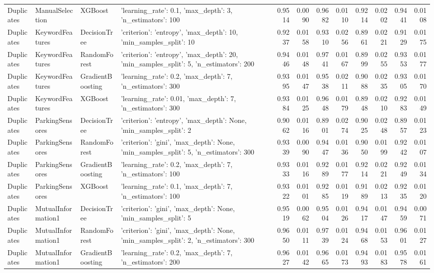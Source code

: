 \begin{tabular}{llllrrrrrrrr}
Duplicates & ManualSelection & XGBoost & {'learning_rate': 0.1, 'max_depth': 3, 'n_estimators': 100} & 0.9514 & 0.0090 & 0.9682 & 0.0110 & 0.9214 & 0.0202 & 0.9441 & 0.0108 \\
Duplicates & KeywordFeatures & DecisionTree & {'criterion': 'entropy', 'max_depth': 10, 'min_samples_split': 10} & 0.9237 & 0.0158 & 0.9310 & 0.0256 & 0.8961 & 0.0221 & 0.9129 & 0.0175 \\
Duplicates & KeywordFeatures & RandomForest & {'criterion': 'entropy', 'max_depth': 20, 'min_samples_split': 5, 'n_estimators': 200} & 0.9446 & 0.0148 & 0.9741 & 0.0167 & 0.8999 & 0.0255 & 0.9353 & 0.0177 \\
Duplicates & KeywordFeatures & GradientBoosting & {'learning_rate': 0.2, 'max_depth': 7, 'n_estimators': 300} & 0.9395 & 0.0147 & 0.9538 & 0.0211 & 0.9088 & 0.0235 & 0.9305 & 0.0170 \\
Duplicates & KeywordFeatures & XGBoost & {'learning_rate': 0.01, 'max_depth': 7, 'n_estimators': 300} & 0.9384 & 0.0125 & 0.9648 & 0.0179 & 0.8948 & 0.0210 & 0.9283 & 0.0149 \\
Duplicates & ParkingSensores & DecisionTree & {'criterion': 'entropy', 'max_depth': None, 'min_samples_split': 2} & 0.9062 & 0.0116 & 0.8901 & 0.0274 & 0.9025 & 0.0248 & 0.8957 & 0.0123 \\
Duplicates & ParkingSensores & RandomForest & {'criterion': 'gini', 'max_depth': None, 'min_samples_split': 5, 'n_estimators': 300} & 0.9339 & 0.0090 & 0.9447 & 0.0136 & 0.9050 & 0.0199 & 0.9242 & 0.0107 \\
Duplicates & ParkingSensores & GradientBoosting & {'learning_rate': 0.2, 'max_depth': 7, 'n_estimators': 100} & 0.9333 & 0.0116 & 0.9289 & 0.0177 & 0.9214 & 0.0221 & 0.9249 & 0.0134 \\
Duplicates & ParkingSensores & XGBoost & {'learning_rate': 0.1, 'max_depth': 7, 'n_estimators': 100} & 0.9322 & 0.0101 & 0.9285 & 0.0119 & 0.9189 & 0.0213 & 0.9235 & 0.0120 \\
Duplicates & MutualInformation1 & DecisionTree & {'criterion': 'gini', 'max_depth': None, 'min_samples_split': 5} & 0.9519 & 0.0062 & 0.9504 & 0.0126 & 0.9417 & 0.0147 & 0.9459 & 0.0071 \\
Duplicates & MutualInformation1 & RandomForest & {'criterion': 'gini', 'max_depth': None, 'min_samples_split': 2, 'n_estimators': 300} & 0.9650 & 0.0111 & 0.9739 & 0.0124 & 0.9468 & 0.0153 & 0.9601 & 0.0127 \\
Duplicates & MutualInformation1 & GradientBoosting & {'learning_rate': 0.2, 'max_depth': 7, 'n_estimators': 200} & 0.9627 & 0.0142 & 0.9665 & 0.0173 & 0.9493 & 0.0183 & 0.9578 & 0.0161 \\

\end{tabular}

